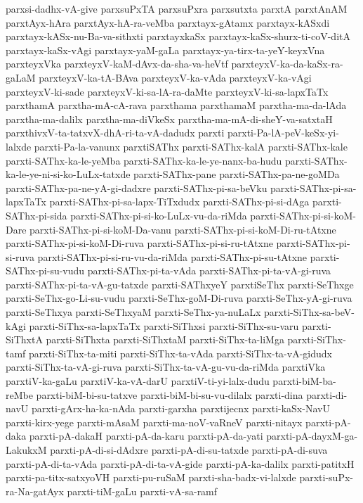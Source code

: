 {parxsi-dadhx-vA-give
parxsuPxTA
parxsuPxra
parxsutxta
parxtA
parxtAnAM
parxtAyx-hAra
parxtAyx-hA-ra-veMba
parxtayx-gAtamx
parxtayx-kASxdi
parxtayx-kASx-nu-Ba-va-sithxti
parxtayxkaSx
parxtayx-kaSx-shurx-ti-coV-ditA
parxtayx-kaSx-vAgi
parxtayx-yaM-gaLa
parxtayx-ya-tirx-ta-yeY-keyxVna
parxteyxVka
parxteyxV-kaM-dAvx-da-sha-va-heVtf
parxteyxV-ka-da-kaSx-ra-gaLaM
parxteyxV-ka-tA-BAva
parxteyxV-ka-vAda
parxteyxV-ka-vAgi
parxteyxV-ki-sade
parxteyxV-ki-sa-lA-ra-daMte
parxteyxV-ki-sa-lapxTaTx
parxthamA
parxtha-mA-cA-rava
parxthama
parxthamaM
parxtha-ma-da-lAda
parxtha-ma-dalilx
parxtha-ma-diVkeSx
parxtha-ma-mA-di-sheY-va-satxtaH
parxthivxV-ta-tatxvX-dhA-ri-ta-vA-dadudx
parxti
parxti-Pa-lA-peV-keSx-yi-lalxde
parxti-Pa-la-vanunx
parxtiSAThx
parxti-SAThx-kalA
parxti-SAThx-kale
parxti-SAThx-ka-le-yeMba
parxti-SAThx-ka-le-ye-nanx-ba-hudu
parxti-SAThx-ka-le-ye-ni-si-ko-LuLx-tatxde
parxti-SAThx-pane
parxti-SAThx-pa-ne-goMDa
parxti-SAThx-pa-ne-yA-gi-dadxre
parxti-SAThx-pi-sa-beVku
parxti-SAThx-pi-sa-lapxTaTx
parxti-SAThx-pi-sa-lapx-TiTxdudx
parxti-SAThx-pi-si-dAga
parxti-SAThx-pi-sida
parxti-SAThx-pi-si-ko-LuLx-vu-da-riMda
parxti-SAThx-pi-si-koM-Dare
parxti-SAThx-pi-si-koM-Da-vanu
parxti-SAThx-pi-si-koM-Di-ru-tAtxne
parxti-SAThx-pi-si-koM-Di-ruva
parxti-SAThx-pi-si-ru-tAtxne
parxti-SAThx-pi-si-ruva
parxti-SAThx-pi-si-ru-vu-da-riMda
parxti-SAThx-pi-su-tAtxne
parxti-SAThx-pi-su-vudu
parxti-SAThx-pi-ta-vAda
parxti-SAThx-pi-ta-vA-gi-ruva
parxti-SAThx-pi-ta-vA-gu-tatxde
parxti-SAThxyeY
parxtiSeThx
parxti-SeThxge
parxti-SeThx-go-Li-su-vudu
parxti-SeThx-goM-Di-ruva
parxti-SeThx-yA-gi-ruva
parxti-SeThxya
parxti-SeThxyaM
parxti-SeThx-ya-nuLaLx
parxti-SiThx-sa-beV-kAgi
parxti-SiThx-sa-lapxTaTx
parxti-SiThxsi
parxti-SiThx-su-varu
parxti-SiThxtA
parxti-SiThxta
parxti-SiThxtaM
parxti-SiThx-ta-liMga
parxti-SiThx-tamf
parxti-SiThx-ta-miti
parxti-SiThx-ta-vAda
parxti-SiThx-ta-vA-gidudx
parxti-SiThx-ta-vA-gi-ruva
parxti-SiThx-ta-vA-gu-vu-da-riMda
parxtiVka
parxtiV-ka-gaLu
parxtiV-ka-vA-darU
parxtiV-ti-yi-lalx-dudu
parxti-biM-ba-reMbe
parxti-biM-bi-su-tatxve
parxti-biM-bi-su-vu-dilalx
parxti-dina
parxti-di-navU
parxti-gArx-ha-ka-nAda
parxti-garxha
parxtijecnx
parxti-kaSx-NavU
parxti-kirx-yege
parxti-mAsaM
parxti-ma-noV-vaRneV
parxti-nitayx
parxti-pA-daka
parxti-pA-dakaH
parxti-pA-da-karu
parxti-pA-da-yati
parxti-pA-dayxM-ga-LakukxM
parxti-pA-di-si-dAdxre
parxti-pA-di-su-tatxde
parxti-pA-di-suva
parxti-pA-di-ta-vAda
parxti-pA-di-ta-vA-gide
parxti-pA-ka-dalilx
parxti-patitxH
parxti-pa-titx-satxyoVH
parxti-pu-ruSaM
parxti-sha-badx-vi-lalxde
parxti-suPx-ra-Na-gatAyx
parxti-tiM-gaLu
parxti-vA-sa-ramf
}
